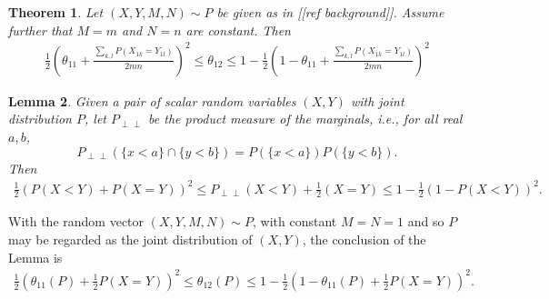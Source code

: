 \message{ !name(manuscript.tex)}\documentclass[12pt]{article}
\DeclareMathOperator{\AUC}{AUC}
\renewcommand{\P}{P}
\newcommand{\cind}{\perp \!\!\! \perp}
\newcommand{\aucindiv}{\theta_{11}}%
\newcommand{\aucpop}{\theta_{12}}%
\newtheorem{theorem}{Theorem}
\newtheorem{lemma}[theorem]{Lemma}
\begin{document}
\begin{theorem}\label{theorem:bounds}
  Let $(X,Y,M,N)\sim \P$ be given as in [[ref background]]. Assume
  further that $M=m$ and $N=n$ are constant. Then
  \begin{align}
    \frac{1}{2}\left(\aucindiv+\frac{\sum_{k,l}\P(X_{1k}=Y_{1l})}{2mn}\right)^2 \le \aucpop \le 1-\frac{1}{2}\left(1-\aucindiv+\frac{\sum_{k,l}\P(X_{1k}=Y_{1l})}{2mn}\right)^2
  \end{align}
\end{theorem}
\begin{lemma}\label{lemma:bounds}  Given a pair of scalar random variables $(X,Y)$ with joint distribution $\P$, let $\P_{\cind}$ be the product measure of the marginals, i.e., for all real $a,b$,
  $$
  \P_{\cind}(\{x<a\}\cap\{y<b\})=\P(\{x<a\})\P(\{y<b\}).
  $$
  Then
  \begin{align}
    \frac{1}{2}(\P(X<Y)+\P(X=Y))^2 \le \P_{\cind}(X<Y)+\frac{1}{2}(X=Y)
    \le 1-\frac{1}{2}(1-\P(X<Y))^2.
  \end{align}
\end{lemma}

With the random vector $(X,Y,M,N) \sim \P$, with constant $M=N=1$ and so $\P$ may be regarded as the joint distribution of $(X,Y)$, the conclusion of the Lemma is
\begin{align}
  \frac{1}{2}(\aucindiv(\P)+\frac{1}{2}\P(X=Y))^2 \le \aucpop(P)
  \le 1-\frac{1}{2}(1-\aucindiv(\P)+\frac{1}{2}\P(X=Y))^2.
\end{align}
\end{document}
